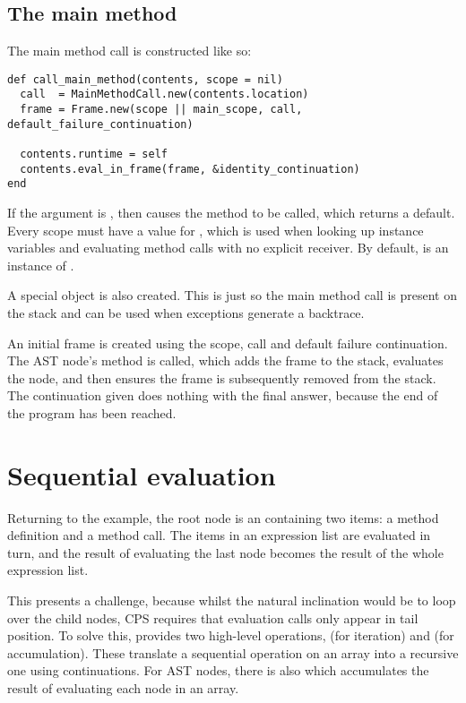 \subsection{The main method}

The main method call is constructed like so:

\begin{minipage}{\textwidth}
\begin{lstlisting}
def call_main_method(contents, scope = nil)
  call  = MainMethodCall.new(contents.location)
  frame = Frame.new(scope || main_scope, call, default_failure_continuation)
  
  contents.runtime = self
  contents.eval_in_frame(frame, &identity_continuation)
end
\end{lstlisting}
\end{minipage}

If the  argument is , then  causes the  method to be called, which returns a default. Every scope must have a value for , which is used when looking up instance variables and evaluating method calls with no explicit receiver. By default,  is an instance of .

A special  object is also created. This is just so the main method call is present on the stack and can be used when exceptions generate a backtrace.

An initial frame is created using the scope, call and default failure continuation. The AST node's  method is called, which adds the frame to the stack, evaluates the node, and then ensures the frame is subsequently removed from the stack. The continuation given does nothing with the final answer, because the end of the program has been reached.

\section{Sequential evaluation}

Returning to the example, the root node is an  containing two items: a method definition and a method call. The items in an expression list are evaluated in turn, and the result of evaluating the last node becomes the result of the whole expression list.

This presents a challenge, because whilst the natural inclination would be to loop over the child nodes, CPS requires that evaluation calls only appear in tail position. To solve this,  provides two high-level operations,  (for iteration) and  (for accumulation). These translate a sequential operation on an array into a recursive one using continuations. For AST nodes, there is also  which accumulates the result of evaluating each node in an array.


